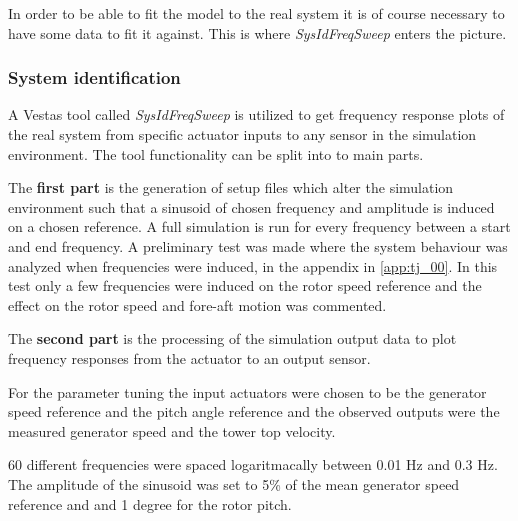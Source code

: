 \medskip
In order to be able to fit the model to the real system it is of course necessary to have some data to fit it against. This is where \textit{SysIdFreqSweep} enters the picture.

\subsubsection{System identification}
A Vestas tool called \textit{SysIdFreqSweep} is utilized to get frequency response plots of the real system from specific actuator inputs to any sensor in the simulation environment. The tool functionality can be split into to main parts. 

The \textbf{first part} is the generation of setup files which alter the simulation environment such that a sinusoid of chosen frequency and amplitude is induced on a chosen reference. A full simulation is run for every frequency between a start and end frequency. A preliminary test was made where the system behaviour was analyzed when frequencies were induced, in the appendix in \cref{app:tj_00}. In this test only a few frequencies were induced on the rotor speed reference and the effect on the rotor speed and fore-aft motion was commented.

The \textbf{second part} is the processing of the simulation output data to plot frequency responses from the actuator to an output sensor. 

\medskip
For the parameter tuning the input actuators were chosen to be the generator speed reference and the pitch angle reference and the observed outputs were the measured generator speed and the tower top velocity.

60 different frequencies were spaced logaritmacally between 0.01 Hz and 0.3 Hz. The amplitude of the sinusoid was set to 5\% of the mean generator speed reference and and 1 degree for the rotor pitch. 
